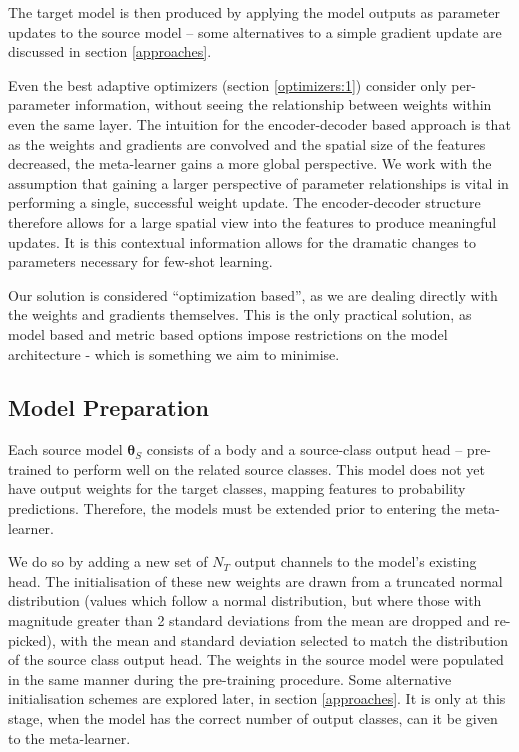 \documentclass{report}
\begin{document}
The target model is then produced by applying the model outputs as parameter updates to the source model -- some alternatives to a simple gradient update are discussed in section \ref{approaches}. \par
Even the best adaptive optimizers (section \ref{optimizers:1}) consider only per-parameter information, without seeing the relationship between weights within even the same layer. The intuition for the encoder-decoder based approach is that as the weights and gradients are convolved and the spatial size of the features decreased, the meta-learner gains a more global perspective. We work with the assumption that gaining a larger perspective of parameter relationships is vital in performing a single, successful weight update. The encoder-decoder structure therefore allows for a large spatial view into the features to produce meaningful updates. It is this contextual information allows for the dramatic changes to parameters necessary for few-shot learning. \par
Our solution is considered ``optimization based'', as we are dealing directly with the weights and gradients themselves. This is the only practical solution, as model based and metric based options impose restrictions on the model architecture - which is something we aim to minimise. \par




\subsection{Model Preparation}
Each source model $\bm{\theta}_S$ consists of a body and a source-class output head -- pre-trained to perform well on the related source classes. This model does not yet have output weights for the target classes, mapping features to probability predictions. Therefore, the models must be extended prior to entering the meta-learner. \par
We do so by adding a new set of $N_T$ output channels to the model's existing head. The initialisation of these new weights are drawn from a truncated normal distribution (values which follow a normal distribution, but where those with magnitude greater than 2 standard deviations from the mean are dropped and re-picked), with the mean and standard deviation selected to match the distribution of the source class output head. The weights in the source model were populated in the same manner during the pre-training procedure. Some alternative initialisation schemes are explored later, in section \ref{approaches}. It is only at this stage, when the model has the correct number of output classes, can it be given to the meta-learner. \par
\end{document}
